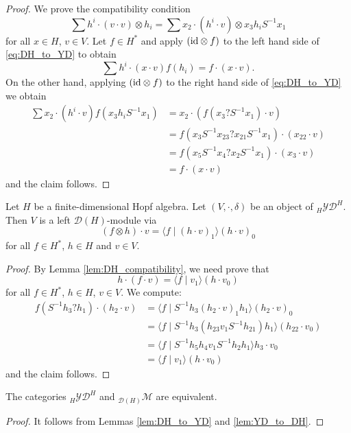 \begin{proof}
We prove the compatibility condition
\begin{equation}
\label{eq:DH_to_YD}
\sum h^i\cdot (v\cdot v)\otimes h_i=\sum x_2\cdot(h^i\cdot v)\otimes x_3h_iS^{-1}x_1
\end{equation}
for all $x\in H$, $v\in V$. Let $f\in H^*$ and apply $(\mathrm{id}\otimes f)$ to the
left hand side of \eqref{eq:DH_to_YD} to obtain
\[
\sum h^i\cdot (x\cdot v)f(h_i)=f\cdot (x\cdot v).
\]
On the other hand, applying $(\mathrm{id}\otimes f)$ to the right hand side of
\eqref{eq:DH_to_YD} we obtain
\begin{align*}
\sum x_2\cdot(h^i\cdot v) f(x_3h_iS^{-1}x_1)&=
x_2\cdot\left( f(x_3?S^{-1}x_1)\cdot v\right)\\
&=f(x_3S^{-1}x_{23}?x_{21}S^{-1}x_1)\cdot (x_{22}\cdot v)\\
&=f(x_5S^{-1}x_4?x_2S^{-1}x_1)\cdot(x_3\cdot v)\\
&=f\cdot (x\cdot v)
\end{align*}
and the claim follows.
\end{proof}

\begin{lemma}
\label{lem:YD_to_DH}
Let $H$ be a finite-dimensional Hopf algebra. Let 
$(V,\cdot,\delta)$ be an object of $_H\mathcal{YD}^H$. Then $V$ is a left
$\mathcal{D}(H)$-module via 
\[
(f\otimes h)\cdot v=\langle f\mid (h\cdot v)_1\rangle (h\cdot v)_0
\]
for all $f\in H^*$, $h\in H$ and $v\in V$.
\end{lemma}

\begin{proof}
By Lemma \ref{lem:DH_compatibility}, we need prove that
\[
h \cdot(f\cdot v)=\langle f\mid v_1\rangle(h\cdot v_0)
\]
for all $f\in H^*$, $h\in H$, $v\in V$. We compute:
\begin{align*}
f(S^{-1}h_3?h_1)\cdot(h_2\cdot v)&=\langle f\mid S^{-1}h_3(h_2\cdot v)_1h_1\rangle(h_2\cdot v)_0\\
&=\langle f\mid S^{-1}h_3(h_{23}v_1S^{-1}h_{21})h_1\rangle(h_{22}\cdot v_0)\\
&=\langle f\mid S^{-1}h_5h_4v_1S^{-1}h_2h_1\rangle h_3\cdot v_0\\
&=\langle f\mid v_1\rangle (h\cdot v_0)
\end{align*}
and the claim follows.
\end{proof}

\begin{theorem}
The categories $_H\mathcal{YD}^H$ and $_{\mathcal{D}(H)}\mathcal{M}$ are
equivalent.
\end{theorem}

\begin{proof}
It follows from Lemmas \ref{lem:DH_to_YD} and \ref{lem:YD_to_DH}.
\end{proof}


